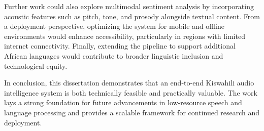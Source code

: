 Further work could also explore multimodal sentiment analysis by incorporating acoustic features such as pitch, tone, and prosody alongside textual content. From a deployment perspective, optimizing the system for mobile and offline environments would enhance accessibility, particularly in regions with limited internet connectivity. Finally, extending the pipeline to support additional African languages would contribute to broader linguistic inclusion and technological equity.

In conclusion, this dissertation demonstrates that an end-to-end Kiswahili audio intelligence system is both technically feasible and practically valuable. The work lays a strong foundation for future advancements in low-resource speech and language processing and provides a scalable framework for continued research and deployment.



